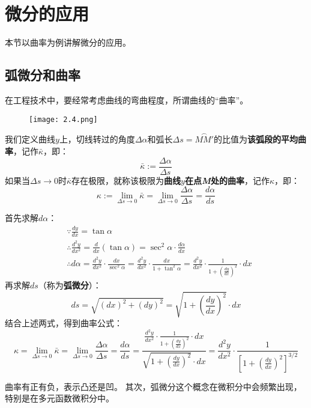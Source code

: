 \section{微分的应用}

本节以曲率为例讲解微分的应用。

\subsection{弧微分和曲率}

在工程技术中，要经常考虑曲线的弯曲程度，所谓曲线的“曲率”。

\begin{figure}[h]
\centering
\texttt{[image: 2.4.png]}
\end{figure}

\begin{definition}[曲率]
我们定义曲线$y$上，切线转过的角度$\Delta \alpha $和弧长$\Delta s=\overset\frown{MM'}$的比值为{\bf 该弧段的平均曲率}，记作$\bar{\kappa}$，即：
\[
\bar{\kappa}:=\frac{\Delta \alpha}{\Delta s}
\]
如果当$\Delta s\rightarrow 0$时$\bar{\kappa}$存在极限，就称该极限为{\bf 曲线$y$在点{\it M}处的曲率}，记作$\kappa $，即：
\[
\kappa :=\underset{\Delta s\rightarrow 0}{\lim}\bar{\kappa}=\underset{\Delta s\rightarrow 0}{\lim}\frac{\Delta \alpha}{\Delta s}=\frac{d\alpha}{ds}
\]
\end{definition}

首先求解$d\alpha $：
\begin{align*}
&\because \frac{dy}{dx}=\tan \alpha \\
&\therefore \frac{d^2y}{dx^2}=\frac{d}{dx}\left( \tan \alpha \right) =\sec ^2\alpha \cdot \frac{d\alpha}{dx} \\
&\therefore d\alpha =\frac{d^2y}{dx^2}\cdot \frac{dx}{\sec ^2\alpha}=\frac{d^2y}{dx^2}\cdot \frac{dx}{1+\tan ^2\alpha}=\frac{d^2y}{dx^2}\cdot \frac{1}{1+\left( \frac{dy}{dx} \right) ^2}\cdot dx
\end{align*}
再求解$ds$（称为{\bf 弧微分}）：
\[
ds=\sqrt{\left( dx \right) ^2+\left( dy \right) ^2}=\sqrt{1+\left( \frac{dy}{dx} \right) ^2}\cdot dx
\]
结合上述两式，得到曲率公式：
\[
\kappa =\underset{\Delta s\rightarrow 0}{\lim}\bar{\kappa}=\underset{\Delta s\rightarrow 0}{\lim}\frac{\Delta \alpha}{\Delta s}=\frac{d\alpha}{ds}=\frac{\frac{d^2y}{dx^2}\cdot \frac{1}{1+\left( \frac{dy}{dx} \right) ^2}\cdot dx}{\sqrt{1+\left( \frac{dy}{dx} \right) ^2}\cdot dx}=\frac{d^2y}{dx^2}\cdot \frac{1}{\left[ 1+\left( \frac{dy}{dx} \right) ^2 \right] ^{3/2}}
\]

\begin{tcolorbox}
曲率有正有负，表示凸还是凹。
其次，弧微分这个概念在微积分中会频繁出现，特别是在多元函数微积分中。
\end{tcolorbox}




